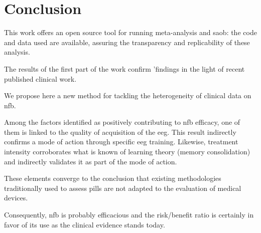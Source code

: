 

\section{Conclusion}

This work offers an open source tool for running meta-analysis and \gls{saob}: the code and data used are available, 
assuring the transparency and replicability of these analysis. 

The results of the first part of the work confirm \citet{Cortese2016}'findings in the light of recent published clinical work.

We propose here a new method for tackling the heterogeneity of clinical data on \gls{nfb}.

Among the factors identified as positively contributing to \gls{nfb} efficacy, one of them is linked to the quality
of acquisition of the \gls{eeg}. This result indirectly confirms a mode of action through specific \gls{eeg} training.
Likewise, treatment intensity corroborates what is known of learning theory (memory consolidation) and indirectly validates it as
part of the mode of action.

These elements converge to the conclusion that existing methodologies traditionally used to assess pills are not adapted to the evaluation 
of medical devices.

Consequently, \gls{nfb} is probably efficacious and the risk/benefit ratio is certainly in favor of its use as the clinical evidence stands today.
